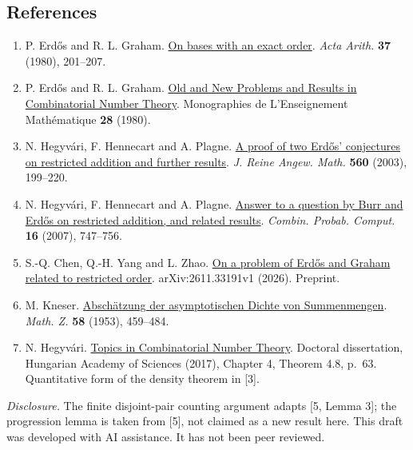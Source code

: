 \documentclass[
  11pt,
]{article}
\providecommand{\tightlist}{%
  \setlength{\itemsep}{0pt}\setlength{\parskip}{0pt}}
\begin{document}
\subsection{References}\label{references}

\begin{enumerate}
\def\labelenumi{\arabic{enumi}.}
\tightlist
\item
  P. Erdős and R. L. Graham.
  \href{https://www.renyi.hu/~p_erdos/1980-22.pdf}{On bases with an
  exact order}. \emph{Acta Arith.} \textbf{37} (1980), 201--207.
\item
  P. Erdős and R. L. Graham.
  \href{https://mathweb.ucsd.edu/~ronspubs/80_11_number_theory.pdf}{Old
  and New Problems and Results in Combinatorial Number Theory}.
  Monographies de L'Enseignement Mathématique \textbf{28} (1980).
\item
  N. Hegyvári, F. Hennecart and A. Plagne.
  \href{https://doi.org/10.1515/crll.2003.055}{A proof of two Erdős'
  conjectures on restricted addition and further results}. \emph{J.
  Reine Angew. Math.} \textbf{560} (2003), 199--220.
\item
  N. Hegyvári, F. Hennecart and A. Plagne.
  \href{https://www.cmls.polytechnique.fr/perso/plagne/Erdos-Burr.pdf}{Answer
  to a question by Burr and Erdős on restricted addition, and related
  results}. \emph{Combin. Probab. Comput.} \textbf{16} (2007), 747--756.
\item
  S.-Q. Chen, Q.-H. Yang and L. Zhao.
  \href{https://arxiv.org/html/2611.33191v1}{On a problem of Erdős and
  Graham related to restricted order}. arXiv:2611.33191v1 (2026).
  Preprint.
\item
  M. Kneser. \href{https://doi.org/10.1007/BF01174162}{Abschätzung der
  asymptotischen Dichte von Summenmengen}. \emph{Math. Z.} \textbf{58}
  (1953), 459--484.
\item
  N. Hegyvári.
  \href{https://real-d.mtak.hu/1038/7/dc_1260_16_doktori_mu.pdf}{Topics
  in Combinatorial Number Theory}. Doctoral dissertation, Hungarian
  Academy of Sciences (2017), Chapter 4, Theorem 4.8, p.~63.
  Quantitative form of the density theorem in {[}3{]}.
\end{enumerate}

\emph{Disclosure.} The finite disjoint-pair counting argument adapts
{[}5, Lemma 3{]}; the progression lemma is taken from {[}5{]}, not
claimed as a new result here. This draft was developed with AI
assistance. It has not been peer reviewed.
\end{document}
